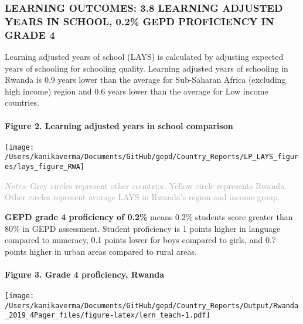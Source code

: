 \documentclass[twocolumn]{article}
\let\oldparagraph\paragraph
\renewcommand{\paragraph}[1]{\oldparagraph{#1}\mbox{}}
\begin{document}
\hypertarget{learning-outcomes-3.8-learning-adjusted-years-in-school-0.2-gepd-proficiency-in-grade-4}{%
\subsubsection{\texorpdfstring{\textbf{LEARNING OUTCOMES: 3.8 LEARNING
ADJUSTED YEARS IN SCHOOL, 0.2\% GEPD PROFICIENCY IN GRADE
4}}{LEARNING OUTCOMES: 3.8 LEARNING ADJUSTED YEARS IN SCHOOL, 0.2\% GEPD PROFICIENCY IN GRADE 4}}\label{learning-outcomes-3.8-learning-adjusted-years-in-school-0.2-gepd-proficiency-in-grade-4}}

Learning adjusted years of school (LAYS) is calculated by adjusting
expected years of schooling for schooling quality. Learning adjusted
years of schooling in Rwanda is 0.9 years lower than the average for
Sub-Saharan Africa (excluding high income) region and 0.6 years lower
than the average for Low income countries.

\hypertarget{figure-2.-learning-adjusted-years-in-school-comparison}{%
\paragraph{Figure 2. Learning adjusted years in school
comparison}\label{figure-2.-learning-adjusted-years-in-school-comparison}}

\texttt{[image: /Users/kanikaverma/Documents/GitHub/gepd/Country\_Reports/LP\_LAYS\_figures/lays\_figure\_RWA]}

{\scriptsize
    \textcolor{darkgray}{\textit{Notes:} Grey circles represent other countries. Yellow circle represents Rwanda. Other circles represent average LAYS in Rwanda's region and income group.}
  }

\textbf{GEPD grade 4 proficiency of 0.2\%} means 0.2\% students score
greater than 80\% in GEPD assessment. Student proficiency is 1 points
higher in language compared to numeracy, 0.1 points lower for boys
compared to girls, and 0.7 points higher in urban areas compared to
rural areas. \vfill\null

\hypertarget{figure-3.-grade-4-proficiency-rwanda}{%
\paragraph{Figure 3. Grade 4 proficiency,
Rwanda}\label{figure-3.-grade-4-proficiency-rwanda}}

\texttt{[image: /Users/kanikaverma/Documents/GitHub/gepd/Country\_Reports/Output/Rwanda\_2019\_4Pager\_files/figure-latex/lern\_teach-1.pdf]}
\end{document}
